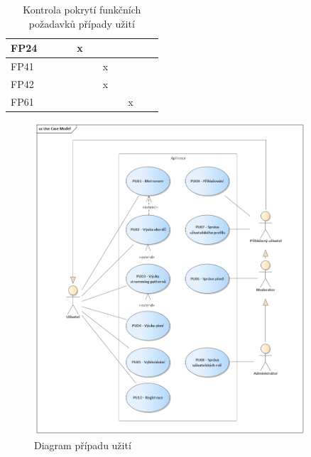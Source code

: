 \begin{table}
\begin{tabular}{l|l|l|l|l|l|l|l|l|l|l}
        \hline
        FP24 &                                &                                &                                & x                              &                                &                                &                                &                                &                                &                                \\
        \hline
        FP41 &                                &                                &                                &                                &                                & x                              &                                &                                &                                &                                \\
        \hline
        FP42 &                                &                                &                                &                                &                                & x                              &                                &                                &                                &                                \\
        \hline
        FP61 &                                &                                &                                &                                &                                &                                &                                & x                              &                                &
    \end{tabular}
    \caption{Kontrola pokrytí funkčních požadavků případy užití}
    \label{tab:func_req_uc_table}
\end{table}


\begin{figure}
    \centering
    \includegraphics[width=0.9\textwidth]{assets/use_case_model.png}
    \caption{Diagram případu užití}
    \label{fig:use_case}
\end{figure}